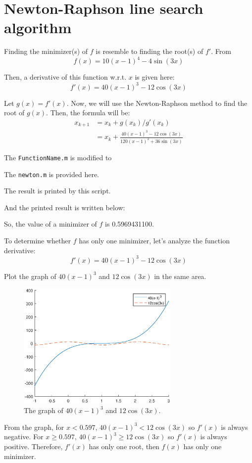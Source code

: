 \documentclass{article}
\begin{document}
\section*{Newton-Raphson line search algorithm}

Finding the minimizer(s) of $f$ is resemble to finding the root(s) of $f'$. From 
$$f(x) = 10(x-1)^4 - 4\sin(3x)$$

Then, a derivative of this function w.r.t. $x$ is given here:
$$f'(x) = 40(x-1)^3 - 12\cos(3x)$$

Let $g(x) = f'(x)$. Now, we will use the Newton-Raphson method to find the root of $g(x)$. Then, the formula will be:
\begin{align*}
    x_{k+1} &= x_k + g(x_k)/g'(x_k) \\
        &= x_k + \frac{40(x-1)^3 - 12\cos(3x)}{120(x-1)^2 + 36\sin(3x)}
\end{align*}

The \lstinline{FunctionName.m} is modified to



The \lstinline{newton.m} is provided here.



The result is printed by this script.



And the printed result is written below:



So, the value of a minimizer of $f$ is 0.5969431100.

To determine whether $f$ has only one minimizer, let's analyze the function derivative: 
$$f'(x) = 40(x-1)^3 - 12\cos(3x)$$

Plot the graph of $40(x-1)^3$ and $12\cos(3x)$ in the same area.

\begin{figure}[h]
    \centering
    \includegraphics[width = 0.7\textwidth]{plot.eps}
    \caption{The graph of $40(x-1)^3$ and $12\cos(3x)$.}
\end{figure}

From the graph, for $x < 0.597$, $40(x-1)^3 < 12\cos(3x)$ so $f'(x)$ is always negative. For $x \geq 0.597$, $40(x-1)^3 \geq 12\cos(3x)$ so $f'(x)$ is always positive. Therefore, $f'(x)$ has only one root, then $f(x)$ has only one minimizer.
\end{document}
